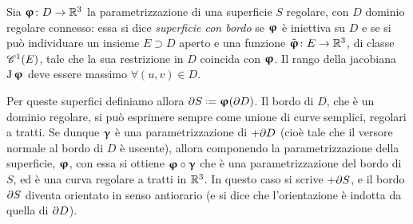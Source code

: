 \begin{definizione} \label{d:superfici-con-bordo}
	Sia $\vphi\colon D\to\R^3$ la parametrizzazione di una superficie $S$ regolare, con $D$ dominio regolare connesso: essa si dice \emph{superficie con bordo} se $\vphi$ è iniettiva su $D$ e se si può individuare un insieme $E\supset D$ aperto e una funzione $\tilde{\vphi}\colon E\to\R^3$, di classe $\cont[1]{E}$, tale che la sua restrizione in $D$ coincida con $\vphi$. Il rango della jacobiana $\jac\vphi$ deve essere massimo $\forall (u,v)\in D$.
\end{definizione}
Per queste superfici definiamo allora $\boundary S\defeq\vphi(\boundary D)$.
Il bordo di $D$, che è un dominio regolare, si può esprimere sempre come unione di curve semplici, regolari a tratti.
Se dunque $\vgamma$ è una parametrizzazione di $+\boundary D$ (cioè tale che il versore normale al bordo di $D$ è uscente), allora componendo la parametrizzazione della superficie, $\vphi$, con essa si ottiene $\vphi\circ\vgamma$ che è una parametrizzazione del bordo di $S$, ed è una curva regolare a tratti in $\R^3$.
In questo caso si scrive $+\boundary S$, e il bordo $\boundary S$ diventa orientato in senso antiorario (e si dice che l'orientazione è indotta da quella di $\boundary D$).


